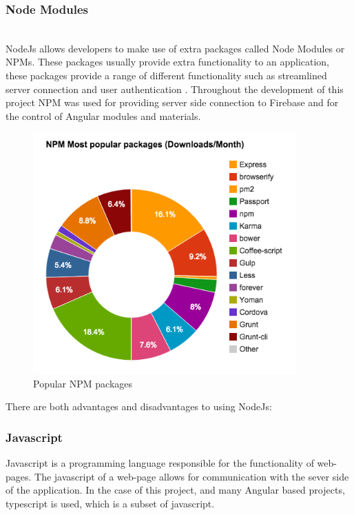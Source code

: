 \subsubsection{Node Modules} \\ 
NodeJs allows developers to make use of extra packages called Node Modules or NPMs. These packages usually provide extra functionality to an application, these packages provide a range of different functionality such as streamlined server connection and user authentication \cite{npm}. Throughout the development of this project NPM was used for providing server side connection to Firebase and for the control of Angular modules and materials.
\newpage
\begin{figure}[h!]
    	\caption{Popular NPM packages}
	\centering
	\includegraphics[width=0.9\textwidth]{images/npm.png}
\end{figure}

There are both advantages and disadvantages to using NodeJs\cite{advdis2}: \\

\subsubsection{Javascript}
Javascript is a programming language responsible for the functionality of web-pages. The javascript of a web-page allows for communication with the sever side of the application. In the case of this project, and many Angular based projects, typescript is used, which is a subset of javascript\cite{jsdocs}.

